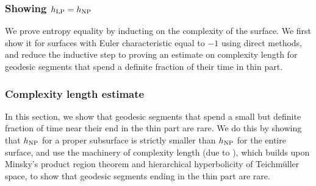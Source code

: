 \subsubsection*{Showing $h_{\mathrm{LP}} = h_{\mathrm{NP}}$}
We prove entropy equality by inducting on the complexity of the surface.
We first show it for surfaces with Euler characteristic equal to $-1$ using direct methods, and reduce the inductive step to proving an estimate on complexity length for geodesic segments that spend a definite fraction of their time in thin part.

\subsubsection*{Complexity length estimate}

In this section, we
show that geodesic segments that spend a small but definite fraction of time near their end in the thin part are rare.
We do this by showing that $h_{\mathrm{NP}}$ for a proper subsurface is strictly smaller than $h_{\mathrm{NP}}$ for the entire surface, and use the machinery of complexity length (due to \textcite{dowdall2023lattice}), which builds upon Minsky's product region theorem and hierarchical hyperbolicity of Teichmüller space, to show that geodesic segments ending in the thin part are rare.

